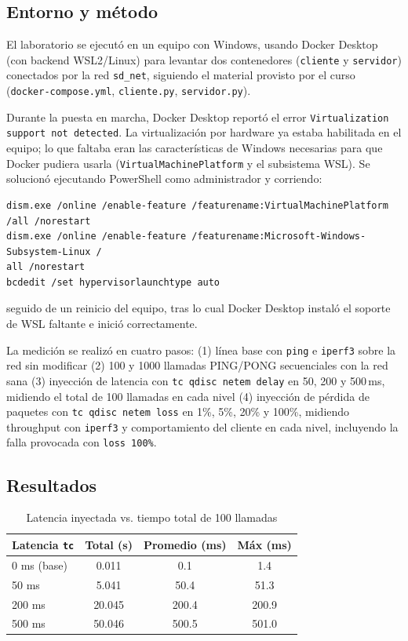 \subsection{Entorno y método}

El laboratorio se ejecutó en un equipo con Windows, usando Docker Desktop
(con backend WSL2/Linux) para levantar dos contenedores (\texttt{cliente} y
\texttt{servidor}) conectados por la red \texttt{sd\_net}, siguiendo el
material provisto por el curso (\texttt{docker-compose.yml},
\texttt{cliente.py}, \texttt{servidor.py}).

Durante la puesta en marcha, Docker Desktop reportó el error
\texttt{Virtualization support not detected}. La virtualización por
hardware ya estaba habilitada en el equipo; lo que faltaba eran las
características de Windows necesarias para que Docker pudiera usarla
(\texttt{VirtualMachinePlatform} y el subsistema WSL). Se solucionó
ejecutando PowerShell como administrador y corriendo:

\begin{verbatim}
dism.exe /online /enable-feature /featurename:VirtualMachinePlatform /all /norestart
dism.exe /online /enable-feature /featurename:Microsoft-Windows-Subsystem-Linux /
all /norestart
bcdedit /set hypervisorlaunchtype auto
\end{verbatim}

seguido de un reinicio del equipo, tras lo cual Docker Desktop instaló el
soporte de WSL faltante e inició correctamente.

La medición se realizó en cuatro pasos: (1) línea base con \texttt{ping} e
\texttt{iperf3} sobre la red sin modificar (2) 100 y 1000 llamadas
PING/PONG secuenciales con la red sana (3) inyección de latencia con
\texttt{tc qdisc netem delay} en 50, 200 y 500\,ms, midiendo el total de 100
llamadas en cada nivel (4) inyección de pérdida de paquetes con
\texttt{tc qdisc netem loss} en 1\%, 5\%, 20\% y 100\%, midiendo throughput
con \texttt{iperf3} y comportamiento del cliente en cada nivel, incluyendo
la falla provocada con \texttt{loss 100\%}.

\subsection{Resultados}

\begin{table}[h]
\centering
\begin{tabular}{|l|c|c|c|}
\hline
\textbf{Latencia \texttt{tc}} & \textbf{Total (s)} & \textbf{Promedio (ms)} & \textbf{Máx (ms)} \\
\hline
0 ms (base) & 0.011 & 0.1 & 1.4 \\
50 ms  & 5.041  & 50.4  & 51.3 \\
200 ms & 20.045 & 200.4 & 200.9 \\
500 ms & 50.046 & 500.5 & 501.0 \\
\hline
\end{tabular}
\caption{Latencia inyectada vs. tiempo total de 100 llamadas}
\end{table}

